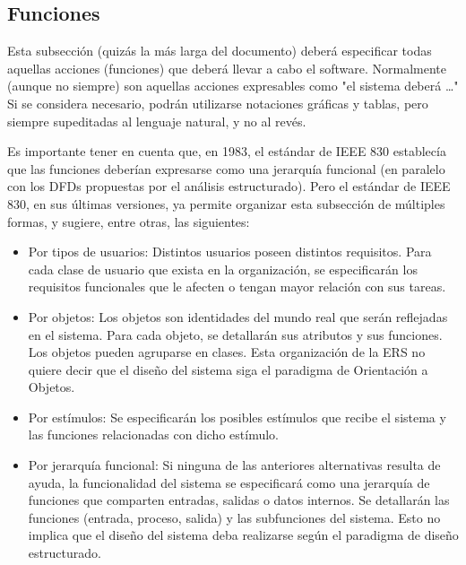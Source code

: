 \documentclass[12pt,a4paper, twosite]{article}
\begin{document}
\subsection{Funciones}
\label{sec:org307bb59}

Esta subsección (quizás la más larga del documento) deberá
especificar todas aquellas acciones (funciones) que deberá llevar a
cabo el software. Normalmente (aunque no siempre) son aquellas
acciones expresables como "el sistema deberá \ldots{}" Si se considera
necesario, podrán utilizarse notaciones gráficas y tablas, pero
siempre supeditadas al lenguaje natural, y no al revés.

Es importante tener en cuenta que, en 1983, el estándar de IEEE 830
establecía que las funciones deberían expresarse como una jerarquía
funcional (en paralelo con los DFDs propuestas por el análisis
estructurado). Pero el estándar de IEEE 830, en sus últimas
versiones, ya permite organizar esta subsección de múltiples formas,
y sugiere, entre otras, las siguientes:


\begin{itemize}
\item Por tipos de usuarios: 
    Distintos usuarios poseen distintos requisitos. Para cada clase de
usuario que exista en la organización, se especificarán los
requisitos funcionales que le afecten o tengan mayor relación con
sus tareas.
\end{itemize}


\begin{itemize}
\item Por objetos:
   Los objetos son identidades del mundo real que serán reflejadas en
el sistema. Para cada objeto, se detallarán sus atributos y sus
funciones. Los objetos pueden agruparse en clases. Esta organización
de la ERS no quiere decir que el diseño del sistema siga el
paradigma de Orientación a Objetos.
\end{itemize}


\begin{itemize}
\item Por estímulos: 
  Se especificarán los posibles estímulos que recibe el sistema y las
funciones relacionadas con dicho estímulo.
\end{itemize}


\begin{itemize}
\item Por jerarquía funcional: 
   Si ninguna de las anteriores alternativas resulta de ayuda, la
funcionalidad del sistema se especificará como una jerarquía de
funciones que comparten entradas, salidas o datos internos. Se
detallarán las funciones (entrada, proceso, salida) y las
subfunciones del sistema. Esto no implica que el diseño del sistema
deba realizarse según el paradigma de diseño estructurado.
\end{itemize}
\end{document}

